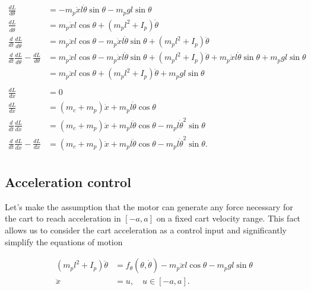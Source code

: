 \documentclass[12pt]{article}
\begin{document}
\begin{align*}
    \frac{dL}{d\theta}                                         & = - m_p \dot{x} l \dot{\theta} \sin \theta - m_p gl \sin \theta \\
    \frac{dL}{d\dot{\theta}}                                   & = m_p \dot{x} l \cos \theta + \left(m_p l^2 + I_p\right) \dot{\theta} \\
    \frac{d}{dt} \frac{dL}{d\dot{\theta}}                      & = m_p \ddot{x} l \cos \theta - m_p  \dot{x}  l \dot{\theta} \sin \theta + \left(m_p l^2 + I_p\right) \ddot{\theta}  \\
    \frac{d}{dt} \frac{dL}{d\dot{\theta}} - \frac{dL}{d\theta} & = m_p \ddot{x} l \cos \theta - m_p  \dot{x}  l \dot{\theta} \sin \theta + \left(m_p l^2 + I_p\right) \ddot{\theta} + m_p \dot{x} l \dot{\theta} \sin \theta + m_p gl \sin \theta \nonumber \\
                                                               & = m_p \ddot{x} l \cos \theta + \left(m_p l^2 + I_p\right) \ddot{\theta} + m_p g l \sin \theta \\
                                                               & \nonumber \\
    \frac{dL}{dx}                                              & = 0 \\
    \frac{dL}{d\dot{x}}                                        & = (m_c + m_p) \dot{x} + m_p l \dot{\theta} \cos \theta \\
    \frac{d}{dt} \frac{dL}{d\dot{x}}                           & = (m_c + m_p) \ddot{x} + m_p l \ddot{\theta} \cos \theta - m_p l \dot{\theta}^2 \sin \theta \\
    \frac{d}{dt} \frac{dL}{d\dot{x}} - \frac{dL}{dx}           & = (m_c + m_p) \ddot{x} + m_p l \ddot{\theta} \cos \theta - m_p l \dot{\theta}^2 \sin \theta. \\
\end{align*}

\subsection{Acceleration control}

Let's make the assumption that the motor can generate any force necessary for the cart to reach acceleration in $[-a, a]$ on a fixed cart velocity range.
This fact allows us to consider the cart acceleration as a control input and significantly simplify the equations of motion

\begin{align}
    \left(m_p l^2 + I_p\right) \ddot{\theta} &= f_{\theta}(\theta, \dot{\theta}) - m_p \ddot{x} l \cos \theta - m_p g l \sin \theta \nonumber \\
    \ddot{x}  &= u, \quad u \in [-a, a].
\end{align}
\end{document}
